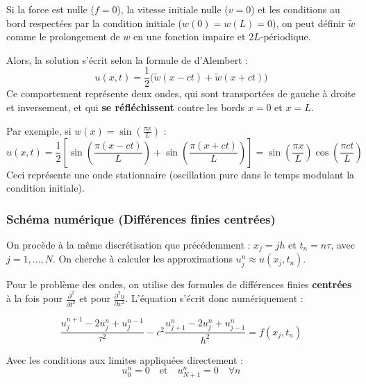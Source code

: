 \begin{exemple}
Si la force est nulle ($f=0$), la vitesse initiale nulle ($v=0$) et les conditions au bord respectées par la condition initiale ($w(0)=w(L)=0$), on peut définir $\tilde{w}$ comme le prolongement de $w$ en une fonction impaire et $2L$-périodique.

Alors, la solution s'écrit selon la formule de d'Alembert :
\begin{equation*}
u(x,t) = \frac{1}{2}\Big( \tilde{w}(x-ct) + \tilde{w}(x+ct) \Big)
\end{equation*}
Ce comportement représente deux ondes, qui sont transportées de gauche à droite et inversement, et qui \textbf{se réfléchissent} contre les bords $x=0$ et $x=L$.

Par exemple, si $w(x) = \sin\left(\frac{\pi x}{L}\right)$ :
\begin{equation*}
u(x,t) = \frac{1}{2} \left[ \sin\left(\frac{\pi(x-ct)}{L}\right) + \sin\left(\frac{\pi(x+ct)}{L}\right) \right] = \sin\left(\frac{\pi x}{L}\right)\cos\left(\frac{\pi c t}{L}\right)
\end{equation*}
Ceci représente une onde stationnaire (oscillation pure dans le temps modulant la condition initiale).
\end{exemple}

\subsubsection{Schéma numérique (Différences finies centrées)}

On procède à la même discrétisation que précédemment : $x_j = j h$ et $t_n = n \tau$, avec $j = 1, \dots, N$. On cherche à calculer les approximations $u_j^n \approx u(x_j, t_n)$.

Pour le problème des ondes, on utilise des formules de différences finies \textbf{centrées} à la fois pour $\frac{\partial^2}{\partial t^2}$ et pour $\frac{\partial^2 u}{\partial x^2}$. L'équation s'écrit donc numériquement :

\begin{equation*}
\frac{u_j^{n+1} - 2u_j^n + u_j^{n-1}}{\tau^2} - c^2 \frac{u_{j+1}^n - 2u_j^n + u_{j-1}^n}{h^2} = f(x_j, t_n)
\end{equation*}

Avec les conditions aux limites appliquées directement :
\begin{equation*}
u_0^n = 0 \quad \text{et} \quad u_{N+1}^n = 0 \quad \forall n
\end{equation*}


